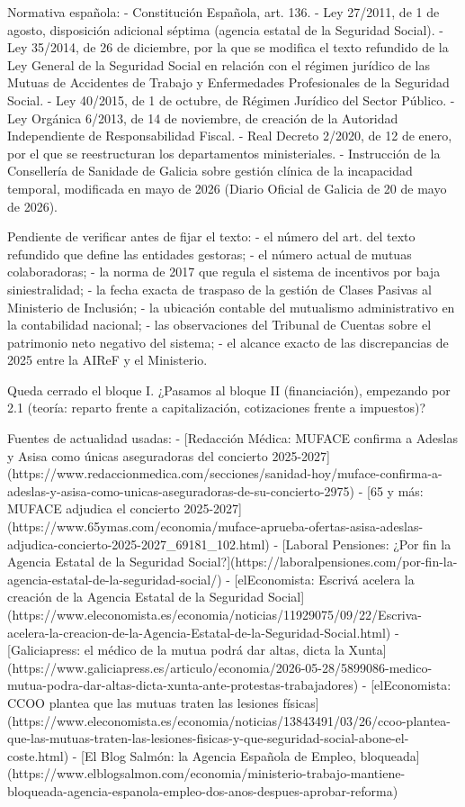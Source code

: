 \documentclass[10pt,a4paper]{article}
\begin{document}
Normativa española:
- Constitución Española, art. 136.
- Ley 27/2011, de 1 de agosto, disposición adicional séptima (agencia estatal de la Seguridad Social).
- Ley 35/2014, de 26 de diciembre, por la que se modifica el texto refundido de la Ley General de la Seguridad Social en relación con el régimen jurídico de las Mutuas de Accidentes de Trabajo y Enfermedades Profesionales de la Seguridad Social.
- Ley 40/2015, de 1 de octubre, de Régimen Jurídico del Sector Público.
- Ley Orgánica 6/2013, de 14 de noviembre, de creación de la Autoridad Independiente de Responsabilidad Fiscal.
- Real Decreto 2/2020, de 12 de enero, por el que se reestructuran los departamentos ministeriales.
- Instrucción de la Consellería de Sanidade de Galicia sobre gestión clínica de la incapacidad temporal, modificada en mayo de 2026 (Diario Oficial de Galicia de 20 de mayo de 2026).

Pendiente de verificar antes de fijar el texto:
- el número del art. del texto refundido que define las entidades gestoras;
- el número actual de mutuas colaboradoras;
- la norma de 2017 que regula el sistema de incentivos por baja siniestralidad;
- la fecha exacta de traspaso de la gestión de Clases Pasivas al Ministerio de Inclusión;
- la ubicación contable del mutualismo administrativo en la contabilidad nacional;
- las observaciones del Tribunal de Cuentas sobre el patrimonio neto negativo del sistema;
- el alcance exacto de las discrepancias de 2025 entre la AIReF y el Ministerio.

Queda cerrado el bloque I. ¿Pasamos al bloque II (financiación), empezando por 2.1 (teoría: reparto frente a capitalización, cotizaciones frente a impuestos)?

Fuentes de actualidad usadas:
- [Redacción Médica: MUFACE confirma a Adeslas y Asisa como únicas aseguradoras del concierto 2025-2027](https://www.redaccionmedica.com/secciones/sanidad-hoy/muface-confirma-a-adeslas-y-asisa-como-unicas-aseguradoras-de-su-concierto-2975)
- [65 y más: MUFACE adjudica el concierto 2025-2027](https://www.65ymas.com/economia/muface-aprueba-ofertas-asisa-adeslas-adjudica-concierto-2025-2027_69181_102.html)
- [Laboral Pensiones: ¿Por fin la Agencia Estatal de la Seguridad Social?](https://laboralpensiones.com/por-fin-la-agencia-estatal-de-la-seguridad-social/)
- [elEconomista: Escrivá acelera la creación de la Agencia Estatal de la Seguridad Social](https://www.eleconomista.es/economia/noticias/11929075/09/22/Escriva-acelera-la-creacion-de-la-Agencia-Estatal-de-la-Seguridad-Social.html)
- [Galiciapress: el médico de la mutua podrá dar altas, dicta la Xunta](https://www.galiciapress.es/articulo/economia/2026-05-28/5899086-medico-mutua-podra-dar-altas-dicta-xunta-ante-protestas-trabajadores)
- [elEconomista: CCOO plantea que las mutuas traten las lesiones físicas](https://www.eleconomista.es/economia/noticias/13843491/03/26/ccoo-plantea-que-las-mutuas-traten-las-lesiones-fisicas-y-que-seguridad-social-abone-el-coste.html)
- [El Blog Salmón: la Agencia Española de Empleo, bloqueada](https://www.elblogsalmon.com/economia/ministerio-trabajo-mantiene-bloqueada-agencia-espanola-empleo-dos-anos-despues-aprobar-reforma)
\end{document}
